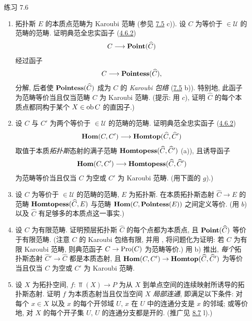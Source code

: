\begin{enonce*}[remark]{练习 7.6}
\begin{enumerate}
\item 拓扑斯 $E$ 的本质点范畴为 Karoubi 范畴 (参见 \hyperref[IV.exer7.5]{7.5} c)). 设 $C$ 为等价于 $\in 𝒰$ 的范畴的范畴. 证明典范全忠实函子 (\hyperref[IV.subsubsec4.6.2]{4.6.2})
$$
C\longrightarrow \operatorname{\mathbf{Point}}(\widehat{C})
$$
经过函子
$$
C\longrightarrow \operatorname{\mathbf{Pointess}}(\widehat{C}){},
$$
分解, 后者使 $\operatorname{\mathbf{Pointess}}(\widehat{C})$ 成为 $C$ 的 \emph{Karoubi 包络} (\hyperref[IV.exer7.5]{7.5} b)). 特别地, 此函子为范畴等价当且仅当范畴 $C$ 为 Karoubi 范畴. (提示: 用 $c$), 证明 $\widehat{C}$ 的每个本质点都同构于某个 $X\in \operatorname{ob} C$ 的直因子.)

\item 设 $C$ 与 $C'$ 为两个等价于 $\in 𝒰$ 的范畴的范畴. 证明典范全忠实函子 (\hyperref[IV.subsubsec4.6.2]{4.6.2})
$$
\operatorname{\mathbf{Hom}}(C,C')\longrightarrow \operatorname{\mathbf{Homtop}}(\widehat{C},\widehat{C}')
$$
取值于本质\emph{拓扑斯}态射的满子范畴 $\operatorname{\mathbf{Homtopess}}(\widehat{C},\widehat{C}')$ (a)), 且诱导函子
$$
\operatorname{\mathbf{Hom}}(C,C')\longrightarrow \operatorname{\mathbf{Homtopess}}(\widehat{C},\widehat{C}')
$$
为范畴等价当且仅当 $C$ 为空或 $C'$ 为 Karoubi 范畴. (用下面的 $g$).)

\item 设 $C$ 为等价于 $\in 𝒰$ 的范畴的范畴, $E$ 为拓扑斯. 在本质拓扑斯态射 $\widehat{C}\rightarrow E$ 的范畴 $\operatorname{\mathbf{Homtopess}}(\widehat{C},E)$ 与范畴 $\operatorname{\mathbf{Hom}}(C, \operatorname{\mathbf{Pointess}}(E))$ 之间定义等价. (用 $b$)\pageoriginale 以及 $\widehat{C}$ 有足够多的本质点这一事实.)

\item 设 $C$ 为有限范畴. 证明预层拓扑斯 $\widehat{C}$ 的每个点都为本质点, 且 $\operatorname{\mathbf{Point}}(\widehat{C})$ 等价于有限范畴. (注意 $C$ 的 Karoubi 包络有限, 并用 , 将问题化为证明: 若 $C$ 为有限 Karoubi 范畴, 则典范函子 $C\rightarrow \operatorname{Pro}(C)$ 为范畴等价.) 用 b) 推出, \emph{每个}拓扑斯态射 $\widehat{C}'\rightarrow \widehat{C}$ 都是本质态射, 且 $\operatorname{\mathbf{Hom}}(C,C')\rightarrow \operatorname{\mathbf{Homtop}}(\widehat{C},\widehat{C}')$ 为等价当且仅当 $C$ 为空或 $C'$ 为 Karoubi 范畴.

\item 设 $X$ 为拓扑空间, $f:\Top(X)\rightarrow P$ 为从 $X$ 到单点空间的连续映射所诱导的拓扑斯态射. 证明 $f$ 为本质态射当且仅当空间 $X$ \emph{局部连通}, 即满足以下条件: 对每个 $x\in X$ 以及 $x$ 的每个开邻域 $U$, $x$ 在 $U$ 中的连通分支是 $x$ 的邻域; 或等价地, 对 $X$ 的每个开子集 $U$, $U$ 的连通分支都是开的. (推广见 \hyperref[IV.exer8.7]{8.7} l).)
\end{enumerate}
\end{enonce*}

